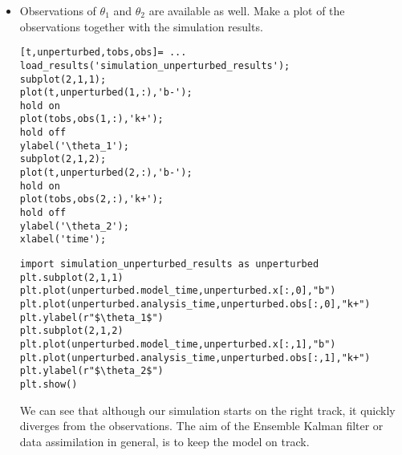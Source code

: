 \begin{itemize}
\begin{lstlisting}[style=PythonStyle,frame=single,caption={Python}]
import ensemble
import simulation_ensemble_results as res
(t,ens)=ensemble.reshape_ensemble(res)
ens1=ens[:,0,:] #note we start counting at 0
ens2=ens[:,1,:]
plt.subplot(2,1,1)
plt.plot(t[1:],ens1,"b")
plt.ylabel(r"$\theta_1$")
plt.subplot(2,1,2)
plt.plot(t[1:],ens2,"b")
plt.ylabel(r"$\theta_2$")
plt.show()
\end{lstlisting}
      
      \item Observations of $\theta_1$ and $\theta_2$ are available as well. Make a plot of
      the observations together with the simulation results.
\ifshowmatlab
\begin{lstlisting}[style=MatlabStyle,frame=single,caption={Matlab}]
[t,unperturbed,tobs,obs]= ...
load_results('simulation_unperturbed_results');
subplot(2,1,1);
plot(t,unperturbed(1,:),'b-');
hold on
plot(tobs,obs(1,:),'k+');
hold off
ylabel('\theta_1');
subplot(2,1,2);
plot(t,unperturbed(2,:),'b-');
hold on
plot(tobs,obs(2,:),'k+');
hold off
ylabel('\theta_2');
xlabel('time');
\end{lstlisting}
\fi
\begin{lstlisting}[style=PythonStyle,frame=single,caption={Python}]
import simulation_unperturbed_results as unperturbed
plt.subplot(2,1,1)
plt.plot(unperturbed.model_time,unperturbed.x[:,0],"b") 
plt.plot(unperturbed.analysis_time,unperturbed.obs[:,0],"k+")
plt.ylabel(r"$\theta_1$")
plt.subplot(2,1,2)
plt.plot(unperturbed.model_time,unperturbed.x[:,1],"b")
plt.plot(unperturbed.analysis_time,unperturbed.obs[:,1],"k+")
plt.ylabel(r"$\theta_2$")
plt.show()
\end{lstlisting}
      
We can see that although our simulation starts on the right track, it quickly diverges from the observations.
The aim of the Ensemble Kalman filter or data assimilation in general, is to keep the model on track. 
\end{itemize}

